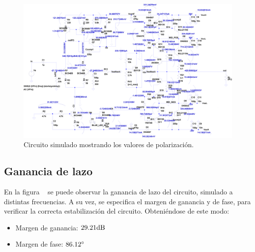 \begin{figure}[H]
    \centering
    \includegraphics[height=0.77 \textwidth, angle=90]{./img/circuito/amplifier.png}
    \caption{Circuito simulado mostrando los valores de polarización.}
    \label{fig:PuntoQ_simulacion}
\end{figure}

\clearpage

\subsection{Ganancia de lazo}

\par En la figura ~ se puede observar la ganancia de lazo del circuito, simulado a distintas frecuencias. A su vez, se especifica el margen de ganancia y de fase, para verificar la correcta estabilización del circuito. Obteniéndose de este modo:

\begin{itemize}
    \item Margen de ganancia: $29.21 \si[per-mode=symbol]{\decibel}$
    \item Margen de fase: $86.12 \si[per-mode=symbol]{\degree}$
\end{itemize}

\vfill

\clearpage

